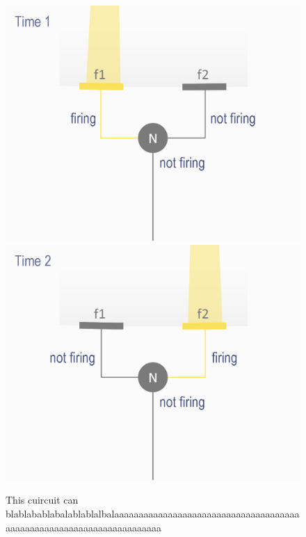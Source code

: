 \documentclass[11pt,a4paper,oneside,table,xcdraw]{article}
\begin{document}
\begin{figure}
\begin{multicols}{2}
\includegraphics[width=1\linewidth]{figure/model1.png}
\columnbreak
\includegraphics[width=1\linewidth]{figure/model2.png}
\end{multicols}
\label{fig:nodelay}
\caption{This cuircuit can blablabablabalablablalbalaaaaaaaaaaaaaaaaaaaaaaaaaaaaaaaaaaaaaaaaaaaaaaaaaaaaaaaaaaaaaaaaaaaaaa}
\end{figure}
\end{document}
